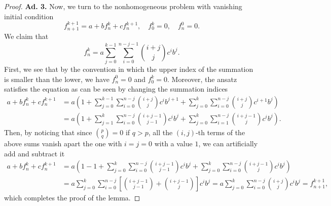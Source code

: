 \documentclass[10pt,a4paper]{amsart}
\begin{document}
\begin{proof}
	\medskip\noindent\textbf{Ad. 3.} Now, we turn to the nonhomogeneous problem with vanishing initial condition
	\begin{equation}
		f^{k+1}_{n+1} = a + b f^k_n + c f^{k+1}_{n}, \quad f^k_0 = 0, \quad f^0_n = 0.
	\end{equation}
	We claim that
	\begin{equation}
		f^k_n = a \sum_{j=0}^{k-1} \sum_{i=0}^{n-j-1} \binom{i+j}{j} c^i b^j.
	\end{equation}
	First, we see that by the convention in which the upper index of the summation is smaller than the lower, we have $f^0_n = 0$ and $f^k_0 = 0$. Moreover, the ansatz satisfies the equation as can be seen by changing the summation indices
	\begin{equation}
		\begin{split}
			a + b f^k_n + c f^{k+1}_{n} 
			&= a\left(1+\sum_{j=0}^{k-1} \sum_{i=0}^{n-j} \binom{i+j}{j} c^i b^{j+1} + \sum_{j=0}^{k} \sum_{i=0}^{n-j} \binom{i+j}{j} c^{i+1} b^j\right) \\
			&= a\left(1+\sum_{j=1}^{k} \sum_{i=0}^{n-j} \binom{i+j-1}{j-1} c^i b^{j} + \sum_{j=0}^{k} \sum_{i=1}^{n-j} \binom{i+j-1}{j} c^{i} b^j\right).
		\end{split}
	\end{equation}
	Then, by noticing that since $\binom{p}{q} = 0$ if $q > p$, all the $(i,j)$-th terms of the above sums vanish apart the one with $i = j = 0$ with a value $1$, we can artificially add and subtract it
	\begin{equation}
		\begin{split}
			a + b f^k_n + c f^{k+1}_{n} 
			&= a\left(1-1+\sum_{j=0}^{k} \sum_{i=0}^{n-j} \binom{i+j-1}{j-1} c^i b^{j} + \sum_{j=0}^{k} \sum_{i=0}^{n-j} \binom{i+j-1}{j} c^{i} b^j\right) \\
			&= a\sum_{j=0}^{k} \sum_{i=0}^{n-j} \left[\binom{i+j-1}{j-1} + \binom{i+j-1}{j}  \right] c^i b^{j} = a\sum_{j=0}^{k} \sum_{i=0}^{n-j} \binom{i+j}{j} c^i b^{j} = f^{k+1}_{n+1},
		\end{split}
	\end{equation}
	which completes the proof of the lemma.
\end{proof}
\end{document}
